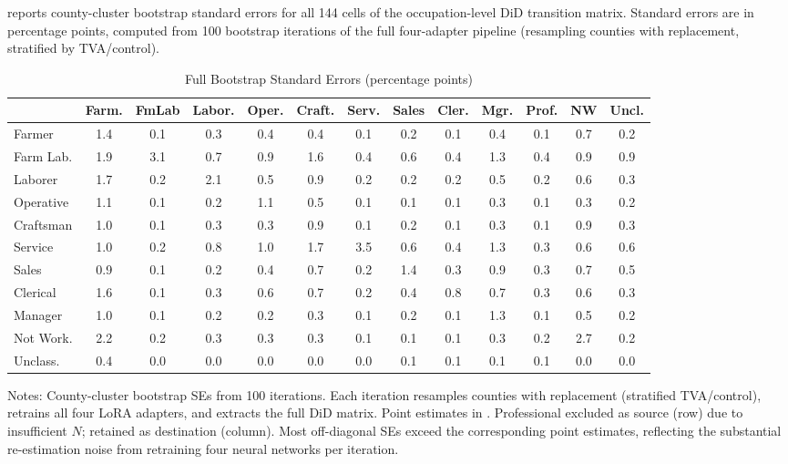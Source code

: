 \documentclass[12pt]{article}
\begin{document}
 reports county-cluster bootstrap standard errors for all 144 cells of the occupation-level DiD transition matrix. Standard errors are in percentage points, computed from 100 bootstrap iterations of the full four-adapter pipeline (resampling counties with replacement, stratified by TVA/control).

\begin{table}[H]
\centering
\caption{Full Bootstrap Standard Errors (percentage points)}
\label{tab:full_bootstrap}
\begin{adjustbox}{max width=\textwidth}
\begin{threeparttable}
\begin{tabular}{l*{12}{S[table-format=1.1]}}
\toprule
& {Farm.} & {FmLab} & {Labor.} & {Oper.} & {Craft.} & {Serv.} & {Sales} & {Cler.} & {Mgr.} & {Prof.} & {NW} & {Uncl.} \\
\midrule
Farmer     & 1.4 & 0.1 & 0.3 & 0.4 & 0.4 & 0.1 & 0.2 & 0.1 & 0.4 & 0.1 & 0.7 & 0.2 \\
Farm Lab.  & 1.9 & 3.1 & 0.7 & 0.9 & 1.6 & 0.4 & 0.6 & 0.4 & 1.3 & 0.4 & 0.9 & 0.9 \\
Laborer    & 1.7 & 0.2 & 2.1 & 0.5 & 0.9 & 0.2 & 0.2 & 0.2 & 0.5 & 0.2 & 0.6 & 0.3 \\
Operative  & 1.1 & 0.1 & 0.2 & 1.1 & 0.5 & 0.1 & 0.1 & 0.1 & 0.3 & 0.1 & 0.3 & 0.2 \\
Craftsman  & 1.0 & 0.1 & 0.3 & 0.3 & 0.9 & 0.1 & 0.2 & 0.1 & 0.3 & 0.1 & 0.9 & 0.3 \\
Service    & 1.0 & 0.2 & 0.8 & 1.0 & 1.7 & 3.5 & 0.6 & 0.4 & 1.3 & 0.3 & 0.6 & 0.6 \\
Sales      & 0.9 & 0.1 & 0.2 & 0.4 & 0.7 & 0.2 & 1.4 & 0.3 & 0.9 & 0.3 & 0.7 & 0.5 \\
Clerical   & 1.6 & 0.1 & 0.3 & 0.6 & 0.7 & 0.2 & 0.4 & 0.8 & 0.7 & 0.3 & 0.6 & 0.3 \\
Manager    & 1.0 & 0.1 & 0.2 & 0.2 & 0.3 & 0.1 & 0.2 & 0.1 & 1.3 & 0.1 & 0.5 & 0.2 \\
Not Work.  & 2.2 & 0.2 & 0.3 & 0.3 & 0.3 & 0.1 & 0.1 & 0.1 & 0.3 & 0.2 & 2.7 & 0.2 \\
Unclass.   & 0.4 & 0.0 & 0.0 & 0.0 & 0.0 & 0.0 & 0.1 & 0.1 & 0.1 & 0.1 & 0.0 & 0.0 \\
\bottomrule
\end{tabular}
\begin{tablenotes}[flushleft]
\small
\item Notes: County-cluster bootstrap SEs from 100 iterations. Each iteration resamples counties with replacement (stratified TVA/control), retrains all four LoRA adapters, and extracts the full DiD matrix. Point estimates in . Professional excluded as source (row) due to insufficient $N$; retained as destination (column). Most off-diagonal SEs exceed the corresponding point estimates, reflecting the substantial re-estimation noise from retraining four neural networks per iteration.
\end{tablenotes}
\end{threeparttable}
\end{adjustbox}
\end{table}
\end{document}
